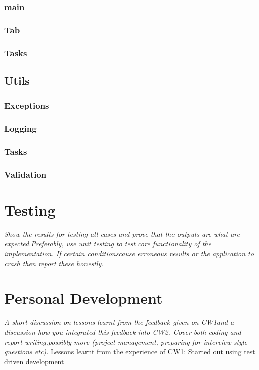 \documentclass[11pt]{article}
\begin{document}
\subsubsection{main}

\subsubsection{Tab}

\subsubsection{Tasks}


\subsection{Utils}
\subsubsection{Exceptions}

\subsubsection{Logging}

\subsubsection{Tasks}

\subsubsection{Validation}

\section{Testing}
\emph{Show  the  results  for  testing  all  cases  and  prove  that  the  outputs  are  what  are  expected.Preferably,  use  unit  testing  to  test  core  functionality  of  the  implementation.   If  certain  conditionscause erroneous results or the application to crash then report these honestly.}

\section{Personal Development}
\emph{A short discussion on lessons learnt from the feedback given on CW1and a discussion how you integrated this feedback into CW2.  Cover both coding and report writing,possibly more (project management, preparing for interview style questions etc).}
Lessons learnt from the experience of CW1:
Started out using test driven development
\end{document}
